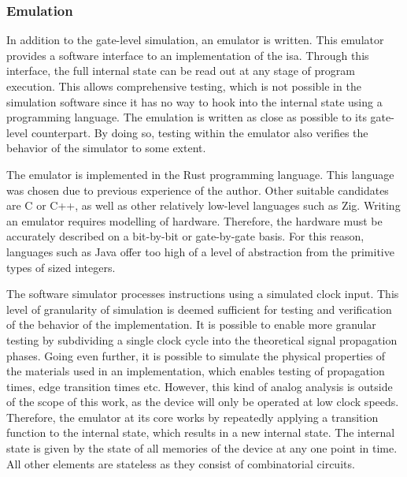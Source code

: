 \subsubsection{Emulation}

In addition to the gate-level simulation, an emulator is written. This emulator provides a software interface to an implementation of the \ac{isa}. Through this interface, the full internal state can be read out at any stage of program execution. This allows comprehensive testing, which is not possible in the simulation software since it has no way to hook into the internal state using a programming language. The emulation is written as close as possible to its gate-level counterpart. By doing so, testing within the emulator also verifies the behavior of the simulator to some extent.

The emulator is implemented in the Rust programming language. This language was chosen due to previous experience of the author. Other suitable candidates are C or C++, as well as other relatively low-level languages such as Zig. Writing an emulator requires modelling of hardware. Therefore, the hardware must be accurately described on a bit-by-bit or gate-by-gate basis. For this reason, languages such as Java offer too high of a level of abstraction from the primitive types of sized integers.

The software simulator processes instructions using a simulated clock input. This level of granularity of simulation is deemed sufficient for testing and verification of the behavior of the implementation. It is possible to enable more granular testing by subdividing a single clock cycle into the theoretical signal propagation phases. Going even further, it is possible to simulate the physical properties of the materials used in an implementation, which enables testing of propagation times, edge transition times etc. However, this kind of analog analysis is outside of the scope of this work, as the device will only be operated at low clock speeds. Therefore, the emulator at its core works by repeatedly applying a transition function to the internal state, which results in a new internal state. The internal state is given by the state of all memories of the device at any one point in time. All other elements are stateless as they consist of combinatorial circuits.

